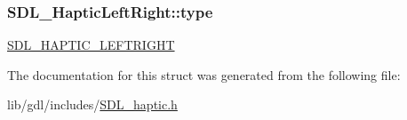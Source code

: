 \subsubsection[{type}]{ S\+D\+L\+\_\+\+Haptic\+Left\+Right\+::type}\label{struct_s_d_l___haptic_left_right_abef79eeb482a8e623e512f0c9635e1a1}
\hyperlink{_s_d_l__haptic_8h_ae047624d8458ff6400887c37a36f86d3}{S\+D\+L\+\_\+\+H\+A\+P\+T\+I\+C\+\_\+\+L\+E\+F\+T\+R\+I\+G\+H\+T} 

The documentation for this struct was generated from the following file\+:\begin{DoxyCompactItemize}
\item 
lib/gdl/includes/\hyperlink{_s_d_l__haptic_8h}{S\+D\+L\+\_\+haptic.\+h}\end{DoxyCompactItemize}
